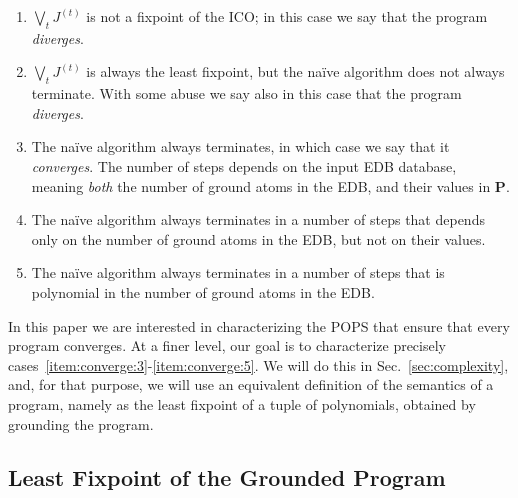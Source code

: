 \begin{enumerate}[label=(\roman*)]
\item $\bigvee_t J^{(t)}$ is not a fixpoint of the ICO; in this case
  we say that the program {\em diverges}.
\item $\bigvee_t J^{(t)}$ is always the least fixpoint, but the
  na\"ive algorithm does not always terminate.  With some abuse we say
  also in this case that the program {\em diverges}.
\item The na\"ive algorithm always terminates, in which case we say
  that it {\em converges}.  The number of steps depends on the input
  EDB database, meaning {\em both} the number of ground atoms in the
  EDB, and their values in $\bm P$.
\item The na\"ive algorithm always terminates in a number of steps
  that depends only on the number of ground atoms in the EDB, but not
  on their values.
\item The na\"ive algorithm always terminates in a number of steps
  that is polynomial in the number of ground atoms in the EDB.
\end{enumerate}

In this paper we are interested in characterizing the POPS that ensure
that every \datalogo program converges.  At a finer level, our goal is
to characterize precisely
cases~\ref{item:converge:3}-\ref{item:converge:5}.  We will do this in
Sec.~\ref{sec:complexity}, and, for that purpose, we will use an
equivalent definition of the semantics of a \datalogo program, namely as
the least fixpoint of a tuple of polynomials, obtained by grounding
the program.

\subsection{Least Fixpoint of the Grounded Program}

